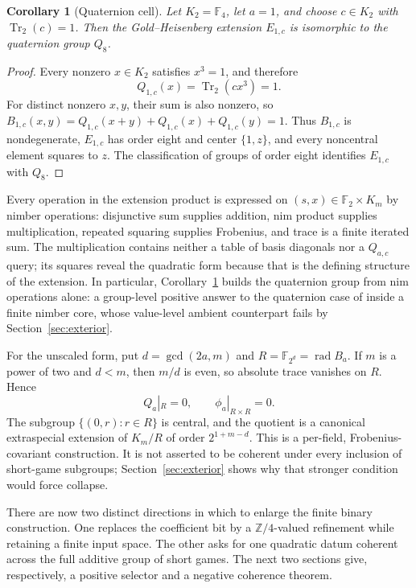 \documentclass[11pt]{article}
\newtheorem{corollary}[theorem]{Corollary}
\theoremstyle{definition}
\theoremstyle{remark}
\newcommand{\F}{\mathbb{F}}
\newcommand{\Tr}{\operatorname{Tr}}
\newcommand{\rad}{\operatorname{rad}}
\begin{document}
\begin{corollary}[Quaternion cell]\label{cor:q8}
Let $K_2=\F_4$, let $a=1$, and choose $c\in K_2$ with $\Tr_2(c)=1$.  Then
the Gold--Heisenberg extension $E_{1,c}$ is isomorphic to the quaternion group
$Q_8$.
\end{corollary}

\begin{proof}
Every nonzero $x\in K_2$ satisfies $x^3=1$, and therefore
\[
 Q_{1,c}(x)=\Tr_2(cx^3)=1.
\]
For distinct nonzero $x,y$, their sum is also nonzero, so
$B_{1,c}(x,y)=Q_{1,c}(x+y)+Q_{1,c}(x)+Q_{1,c}(y)=1$.
Thus $B_{1,c}$ is nondegenerate, $E_{1,c}$ has order eight and center
$\{1,z\}$, and every noncentral element squares to $z$.  The classification
of groups of order eight identifies $E_{1,c}$ with $Q_8$.
\end{proof}

Every operation in the extension product is expressed on
$(s,x)\in\F_2\times K_m$ by nimber operations: disjunctive sum supplies
addition, nim product supplies multiplication, repeated squaring supplies
Frobenius, and trace is a finite iterated sum.  The multiplication contains
neither a table of basis diagonals nor a $Q_{a,c}$ query; its squares reveal
the quadratic form because that is the defining structure of the extension.
In particular, Corollary~\ref{cor:q8} builds the quaternion group from nim
operations alone: a group-level positive answer to the quaternion case of
\cite[Problem~5.3(j)]{altmanlipparini2026} inside a finite nimber core,
whose value-level ambient counterpart fails by
Section~\ref{sec:exterior}.

For the unscaled form, put $d=\gcd(2a,m)$ and
$R=\F_{2^d}=\rad B_a$.  If $m$ is a power of two and $d<m$, then $m/d$ is
even, so absolute trace vanishes on $R$.  Hence
\[
 Q_a|_R=0,\qquad \phi_a|_{R\times R}=0.
\]
The subgroup $\{(0,r):r\in R\}$ is central, and the quotient is a canonical
extraspecial extension of $K_m/R$ of order $2^{1+m-d}$.  This is a
per-field, Frobenius-covariant construction.  It is not asserted to be
coherent under every inclusion of short-game subgroups; Section~\ref{sec:exterior}
shows why that stronger condition would force collapse.

There are now two distinct directions in which to enlarge the finite binary
construction.  One replaces the coefficient bit by a $\mathbb Z/4$-valued
refinement while retaining a finite input space.  The other asks for one
quadratic datum coherent across the full additive group of short games.  The
next two sections give, respectively, a positive selector and a negative
coherence theorem.
\end{document}
